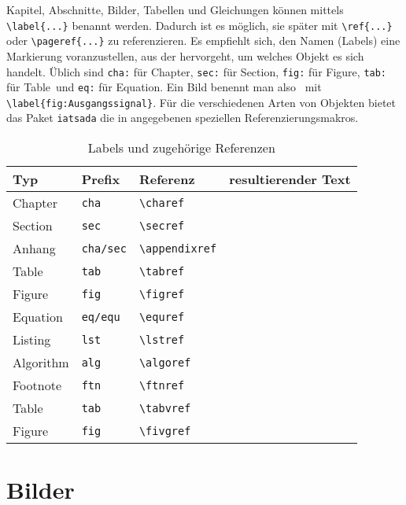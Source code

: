Kapitel, Abschnitte, Bilder, Tabellen und Gleichungen können mittels \verb|\label{...}| benannt werden.
Dadurch ist es möglich, sie später mit \verb|\ref{...}| oder \verb|\pageref{...}| zu referenzieren.
Es empfiehlt sich, den Namen (Labels) eine Markierung voranzustellen, aus der hervorgeht, um welches Objekt es sich handelt.
Üblich sind \verb|cha:| für \glqq Chapter\grqq, \verb|sec:| für \glqq Section\grqq, \verb|fig:| für \glqq Figure\grqq, \verb|tab:| für \glqq Table\grqq\ und \verb|eq:| für \glqq Equation\grqq.
Ein Bild benennt man also \zB\ mit \verb|\label{fig:Ausgangssignal}|.
Für die verschiedenen Arten von Objekten bietet das Paket \texttt{iatsada} die in  angegebenen speziellen Referenzierungsmakros.
\begin{table}
	\centering
	\begin{tabular}{llll}
		Typ			&	Prefix				&	Referenz			&	resultierender Text\\\hline
		Chapter		&	\texttt{cha}		&	\verb|\charef|		&	\charef{cha:Hinweise-Latex}\\
		Section		&	\texttt{sec}		&	\verb|\secref|		&	\secref{sec:Latex-Gliederung}\\
		Anhang		&	\texttt{cha/sec}	&	\verb|\appendixref|	&	\appendixref{cha:Checkliste}\\
		Table		&	\texttt{tab}		&	\verb|\tabref|		&	\tabref{tab:Referenzen}\\
		Figure		&	\texttt{fig}		&	\verb|\figref|		&	\figref{fig:Standardregelkreis}\\
		Equation	&	\texttt{eq/equ}		&	\verb|\equref|		&	\equref{eq:Allgemein-Approx}\\
		Listing		&	\texttt{lst}		&	\verb|\lstref|		&	\lstref{lst:Listing1}\\
		Algorithm	&	\texttt{alg}		&	\verb|\algoref|		&	\algoref{lst:Listing1}\\
		Footnote	&	\texttt{ftn}		&	\verb|\ftnref|		&	\ftnref{ftn:Fussnote1}\\\hline
		Table		&	\texttt{tab}		&	\verb|\tabvref|		&	\tabvref{tab:Systemparameter}\\
		Figure		&	\texttt{fig}		&	\verb|\fivgref|		&	\figvref{fig:Standardregelkreis}\\
	\end{tabular}
	\caption{Labels und zugehörige Referenzen}
	\label{tab:Referenzen}
\end{table}

\section{Bilder}
\label{sec:Latex-Bilder}

